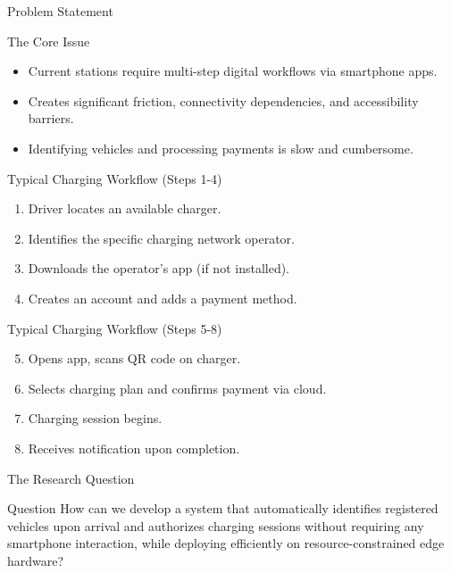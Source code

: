 \documentclass{beamer}
\begin{document}
\begin{frame}
    \centering
    \Huge Problem Statement
\end{frame}

\begin{frame}{The Core Issue}
\begin{itemize}
    \item Current stations require multi-step digital workflows via smartphone apps.
    \item Creates significant friction, connectivity dependencies, and accessibility barriers.
    \item Identifying vehicles and processing payments is slow and cumbersome.
\end{itemize}
\end{frame}

\begin{frame}{Typical Charging Workflow (Steps 1-4)}
\begin{enumerate}
    \item Driver locates an available charger.
    \item Identifies the specific charging network operator.
    \item Downloads the operator's app (if not installed).
    \item Creates an account and adds a payment method.
\end{enumerate}
\end{frame}

\begin{frame}{Typical Charging Workflow (Steps 5-8)}
\begin{enumerate}
    \setcounter{enumi}{4}
    \item Opens app, scans QR code on charger.
    \item Selects charging plan and confirms payment via cloud.
    \item Charging session begins.
    \item Receives notification upon completion.
\end{enumerate}
\end{frame}

\begin{frame}{The Research Question}
\begin{block}{Question}
How can we develop a system that automatically identifies registered vehicles upon arrival and authorizes charging sessions without requiring any smartphone interaction, while deploying efficiently on resource-constrained edge hardware?
\end{block}
\end{frame}
\end{document}
